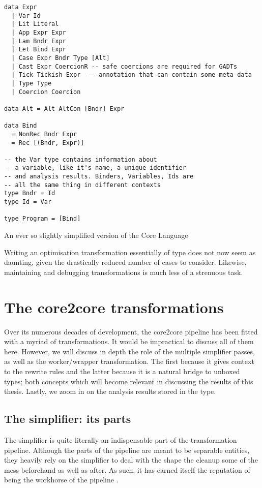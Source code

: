 \begin{listing}[H]
\begin{verbatim}
data Expr
  | Var Id
  | Lit Literal
  | App Expr Expr
  | Lam Bndr Expr
  | Let Bind Expr
  | Case Expr Bndr Type [Alt]
  | Cast Expr CoercionR -- safe coercions are required for GADTs
  | Tick Tickish Expr  -- annotation that can contain some meta data
  | Type Type
  | Coercion Coercion
  
data Alt = Alt AltCon [Bndr] Expr
 
data Bind
  = NonRec Bndr Expr
  = Rec [(Bndr, Expr)]
  
-- the Var type contains information about
-- a variable, like it's name, a unique identifier
-- and analysis results. Binders, Variables, Ids are
-- all the same thing in different contexts
type Bndr = Id
type Id = Var

type Program = [Bind]
\end{verbatim}
\label{code:core_def}
\caption{An ever so slightly simplified version of the Core Language}
\end{listing}

Writing an optimisation transformation essentially of type  does not now seem
as daunting, given the drastically reduced number of cases to consider. 
Likewise, maintaining and debugging transformations is much less of a strenuous task.

\section{The core2core transformations}

Over its numerous decades of development, the core2core pipeline has been fitted with a myriad of transformations.
It would be impractical to discuss all of them here. However, we will discuss in depth the role of the multiple simplifier
passes, as well as the worker/wrapper transformation. The first because it gives context to the rewrite rules and the latter
because it is a natural bridge to unboxed types; both concepts which will become relevant in discussing the results of this thesis.
Lastly, we zoom in on the analysis results stored in the  type.

\subsection{The simplifier: its parts}

The simplifier is quite literally an indispensable part of the transformation pipeline. Although the parts of the pipeline
are meant to be separable entities, they heavily rely on the simplifier to deal with the shape the cleanup some of the mess beforehand as
well as after.
As such, it has earned itself the reputation of being the workhorse of the pipeline \cite{ghc_wiki_core2core}.

